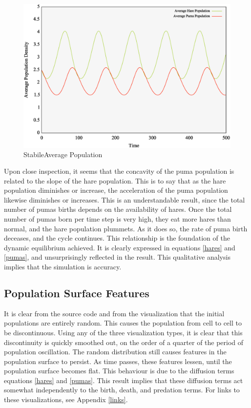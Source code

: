 \documentclass[a4paper,11pt]{article}
\begin{document}
\begin{figure}[h]
\includegraphics[width=\textwidth]{stable.eps}
\caption{StabileAverage Population}
\label{fig:stable}
\end{figure}
 
 
Upon close inspection, it seems that the concavity of the puma population is related to the slope of the hare population.  This is to say that as the hare population diminishes or increase, the acceleration of the puma population likewise diminishes or increases.  This is an understandable result, since the total number of pumas births depends on the availability of hares.  Once the total number of pumas born per time step is very high, they eat more hares than normal, and the hare population plummets.  As it does so, the rate of puma birth deceases, and the cycle continues.  This relationship is the foundation of the dynamic equilibrium achieved.  It is clearly expressed in equations \eqref{hares} and \eqref{pumas}, and unsurprisingly reflected in the result.  This qualitative analysis implies that the simulation is accuracy. 

\subsection{Population Surface Features}
 
It is clear from the source code and from the visualization that the initial populations are entirely random.  This causes the population from cell to cell to be discontinuous.  Using any of the three visualization types, it is clear that this discontinuity is quickly smoothed out, on the order of a quarter of the period of population oscillation.  The random distribution still causes features in the population surface to persist.  As time passes, these features lessen, until the population surface becomes flat.  This behaviour is due to the diffusion terms equations \eqref{hares} and \eqref{pumas}.  This result implies that these diffusion terms act somewhat independently to the birth, death, and predation terms.  For links to these visualizations, see Appendix \ref{links}.
 
\end{document}
